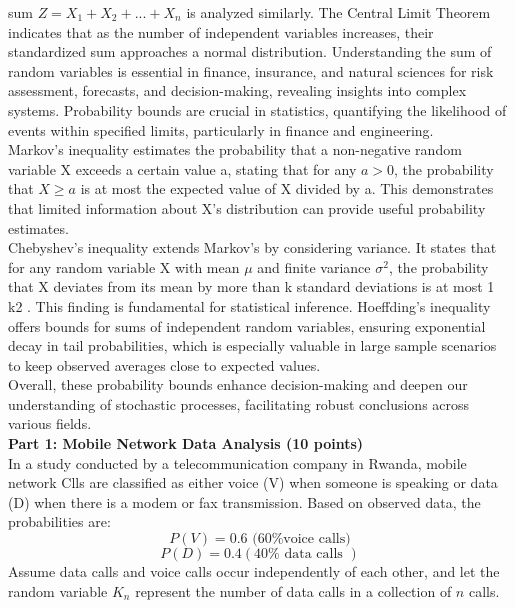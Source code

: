 \documentclass[a3paper,12pt]{extarticle} %
\begin{document}
    sum \(Z = X_1 + X_2 + . . . + X_n\) is analyzed similarly. The Central Limit Theorem indicates that as the
    number of independent variables increases, their standardized sum approaches a normal distribution.
    Understanding the sum of random variables is essential in finance, insurance, and natural sciences for
    risk assessment, forecasts, and decision-making, revealing insights into complex systems.
    Probability bounds are crucial in statistics, quantifying the likelihood of events within specified limits,
    particularly in finance and engineering.
    \\ Markov’s inequality estimates the probability that a non-negative random variable X exceeds a certain
    value a, stating that for any \(a > 0\), the probability that \(X \geq a\) is at most the expected value of X divided
    by a. This demonstrates that limited information about X’s distribution can provide useful probability
    estimates.
    \\ Chebyshev’s inequality extends Markov’s by considering variance. It states that for any random variable
    X with mean \(\mu\) and finite variance \(\sigma^2\), the probability that X deviates from its mean by more than k
    standard deviations is at most 1
    k2 . This finding is fundamental for statistical inference.
    Hoeffding’s inequality offers bounds for sums of independent random variables, ensuring exponential
    decay in tail probabilities, which is especially valuable in large sample scenarios to keep observed averages
    close to expected values.
    \\ Overall, these probability bounds enhance decision-making and deepen our understanding of stochastic
    processes, facilitating robust conclusions across various fields.
    \\ \subitem \textbf{Part 1: Mobile Network Data Analysis (10 points)}
    \\ In a study conducted by a telecommunication company in Rwanda, mobile network Clls are classified as either voice (V) when someone is speaking or data (D) when there is a modem or fax transmission. Based on observed data, the probabilities are:
    \[
    P(V) = 0.6 \text{ (60\% voice calls)}
    \]
    \[
    P(D) = 0.4 (40\% \text{ data calls })
    \]
    Assume data calls and voice calls occur independently of each other, and let the random variable \(K_n\) represent the number of data calls in a collection of \(n\) calls.
\end{document}
